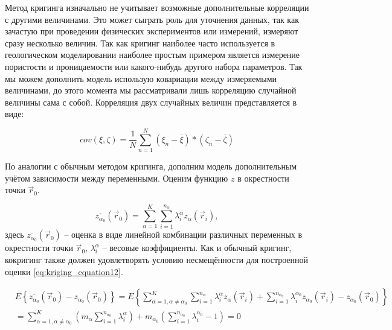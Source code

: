 Метод кригинга изначально не учитывает возможные дополнительные корреляции с другими величинами. Это может сыграть роль для уточнения данных, так как зачастую при проведении физических экспериментов или измерений, измеряют сразу несколько величин. Так как кригинг наиболее часто используется в геологическом моделировании наиболее простым примером является измерение пористости и проницаемости или какого-нибудь другого набора параметров. Так мы можем дополнить модель использую ковариации между измеряемыми величинами, до этого момента мы рассматривали лишь корреляцию случайной величины сама с собой. Корреляция двух случайных величин представляется в виде:

\begin{equation}
  \label{eq:kriging_equation11}
  cov(\xi, \zeta) = \frac{1}{N} \sum_{n = 1}^N (\xi_n - \overline{\xi}) * (\zeta_n - \overline{\zeta})
\end{equation}

По аналогии с обычным методом кригинга, дополним модель дополнительным учётом зависимости между переменными. Оценим функцию $z$ в окрестности точки $\vec r_0$.  

\begin{equation}
  \label{eq:kriging_equation12}
  \overline{z_{\alpha_0}} (\vec r_0) = \sum_{\alpha = 1}^K \sum_{i = 1}^{n_\alpha} \lambda_{i}^{\alpha} z_{\alpha}(\vec r_i),
\end{equation}
здесь $\overline{z_{\alpha_0}} (\vec r_0)$ -- оценка в виде линейной комбинации различных переменных в окрестности точки $\vec r_0$, $\lambda_{i}^{\alpha}$ -- весовые коэффициенты. Как и обычный кригинг, кокригинг также должен удовлетворять условию несмещённости для построенной оценки \eqref{eq:kriging_equation12}.

\begin{align}
    & E \left\{ \overline{z_{\alpha_0}} (\vec r_0) - z_{\alpha_0} (\vec r_0) \right\} = E \left\{ \sum_{\alpha = 1, \alpha \neq \alpha_0}^K \sum_{i = 1}^{n_\alpha} \lambda_{i}^{\alpha} z_{\alpha}(\vec r_i) + \sum_{i = 1}^{n_{\alpha_0}} \lambda_i^{\alpha_0} z_{\alpha_0} (\vec r_i) - z_{\alpha_0} (\vec r_0) \right\} \nonumber \\
    & = \sum_{\alpha = 1, \alpha \neq \alpha_0} ^ K \left( m_\alpha \sum_{i = 1}^{n_{\alpha_0}} \lambda_i^\alpha \right)
    + m_{\alpha_0} \left( \sum_{i = 1}^{n_{\alpha_0}} \lambda_i^{\alpha_0} - 1 \right) = 0
\end{align}

